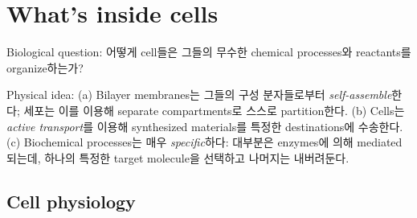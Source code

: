 %
%
%
\chapter{What's inside cells}

Biological question: 어떻게 cell들은 그들의 무수한 chemical processes와 reactants를 organize하는가?

Physical idea: (a) Bilayer membranes는 그들의 구성 분자들로부터 \emph{self-assemble}한다; 세포는 이를 이용해 separate compartments로 스스로 partition한다. (b) Cells는 \emph{active transport}를 이용해 synthesized materials를 특정한 destinations에 수송한다. (c) Biochemical processes는 매우 \emph{specific}하다: 대부분은 enzymes에 의해 mediated되는데, 하나의 특정한 target molecule을 선택하고 나머지는 내버려둔다.

\section{Cell physiology}

